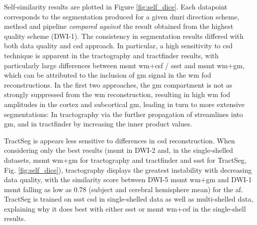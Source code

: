 \documentclass[12pt,phd,a4paper,twoside]{ucl_thesis}
\begin{document}
Self-similarity results are plotted in Figure \ref{fig:self_dice}.
Each datapoint corresponds to the segmentation produced for a given \gls{dmri} direction scheme, method and pipeline \textit{compared against} the result obtained from the highest quality scheme (DWI-1).
The consistency in segmentation results differed with both data quality and \gls{csd} approach.
In particular, a high sensitivity to \gls{csd} technique is apparent in the tractography and tractfinder results, with particularly large differences between \gls{msmt} \gls{wm}+\gls{csf} / \gls{ssst} and \gls{msmt} \gls{wm}+\gls{gm}, which can be attributed to the inclusion of \gls{gm} signal in the \gls{wm} \gls{fod} reconstructions.
In the first two approaches, the \gls{gm} compartment is not as strongly suppressed from the \gls{wm} reconstruction, resulting in high \gls{wm} \gls{fod} amplitudes in the cortex and subcortical \gls{gm}, leading in turn to more extensive segmentations:
In tractography via the further propagation of streamlines into \gls{gm}, and in tractfinder by increasing the inner product values.

TractSeg is appears less sensitive to differences in \gls{csd} reconstruction.
When considering only the best results (\gls{msmt} in DWI-2 and, in the single-shelled datasets, \gls{msmt} \gls{wm}+\gls{gm} for tractography and tractfinder and \gls{ssst} for TractSeg, Fig. \ref{fig:self_dice}), tractography displays the greatest instability with decreasing data quality, with the similarity score between DWI-5 \gls{msmt} \gls{wm}+\gls{gm} and DWI-1 \gls{msmt} falling as low as 0.78 (subject and cerebral hemisphere mean) for the \gls{af}.
TractSeg is trained on \gls{ssst} \gls{csd} in single-shelled data as well as multi-shelled data, explaining why it does best with either \gls{ssst} or \gls{msmt} \gls{wm}+\gls{csf} in the single-shell results.
\end{document}

